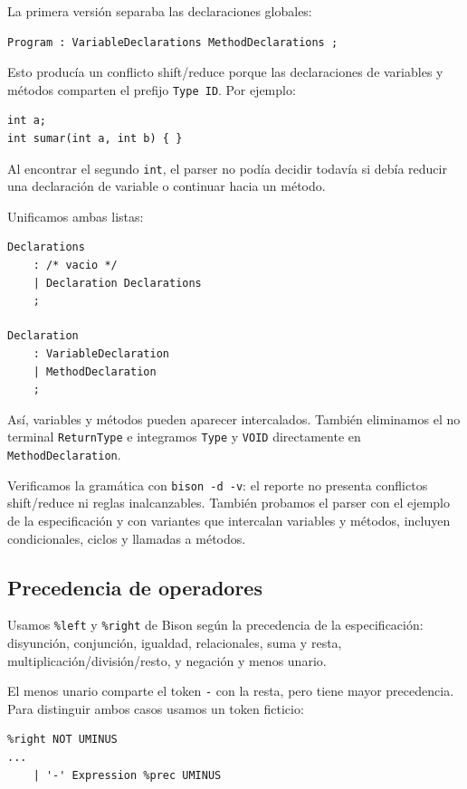 \documentclass[11pt,a4paper]{article}
\begin{document}
La primera versión separaba las declaraciones globales:

\begin{verbatim}
Program : VariableDeclarations MethodDeclarations ;
\end{verbatim}

Esto producía un conflicto shift/reduce porque las declaraciones de variables
y métodos comparten el prefijo \texttt{Type ID}. Por ejemplo:

\begin{verbatim}
int a;
int sumar(int a, int b) { }
\end{verbatim}

Al encontrar el segundo \texttt{int}, el parser no podía decidir todavía si
debía reducir una declaración de variable o continuar hacia un método.

Unificamos ambas listas:

\begin{verbatim}
Declarations
    : /* vacio */
    | Declaration Declarations
    ;

Declaration
    : VariableDeclaration
    | MethodDeclaration
    ;
\end{verbatim}

Así, variables y métodos pueden aparecer intercalados. También eliminamos el
no terminal \texttt{ReturnType} e integramos \texttt{Type} y \texttt{VOID}
directamente en \texttt{MethodDeclaration}.

Verificamos la gramática con \texttt{bison -d -v}: el reporte no presenta
conflictos shift/reduce ni reglas inalcanzables. También probamos el parser
con el ejemplo de la especificación y con variantes que intercalan variables
y métodos, incluyen condicionales, ciclos y llamadas a métodos.

\subsection{Precedencia de operadores}

Usamos \texttt{\%left} y \texttt{\%right} de Bison según la precedencia de la
especificación: disyunción, conjunción, igualdad, relacionales, suma y resta,
multiplicación/división/resto, y negación y menos unario.

El menos unario comparte el token \texttt{-} con la resta, pero tiene mayor
precedencia. Para distinguir ambos casos usamos un token ficticio:

\begin{verbatim}
%right NOT UMINUS
...
    | '-' Expression %prec UMINUS
\end{verbatim}
\end{document}
